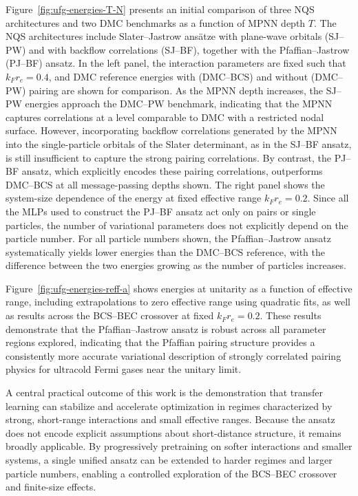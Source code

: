 Figure~\ref{fig:ufg-energies-T-N} presents an initial comparison of three NQS architectures and two DMC benchmarks as a function of MPNN depth \(T\). The NQS architectures include Slater--Jastrow ans\"atze with plane-wave orbitals (SJ--PW) and with backflow correlations (SJ--BF), together with the Pfaffian--Jastrow (PJ--BF) ansatz. In the left panel, the interaction parameters are fixed such that \(k_F r_e = 0.4\), and DMC reference energies with (DMC--BCS) and without (DMC--PW) pairing are shown for comparison.
As the MPNN depth increases, the SJ--PW energies approach the DMC--PW benchmark, indicating that the MPNN captures correlations at a level comparable to DMC with a restricted nodal surface. 
However, incorporating backflow correlations generated by the MPNN into the single-particle orbitals of the Slater determinant, as in the SJ--BF ansatz, is still insufficient to capture the strong pairing correlations.
By contrast, the PJ--BF ansatz, which explicitly encodes these pairing correlations, outperforms DMC--BCS at all message-passing depths shown.
The right panel shows the system-size dependence of the energy at fixed effective range \(k_F r_e = 0.2\). Since all the MLPs used to construct the PJ--BF ansatz act only on pairs or single particles, the number of variational parameters does not explicitly depend on the particle number. For all particle numbers shown, the Pfaffian--Jastrow ansatz systematically yields lower energies than the DMC--BCS reference, with the difference between the two energies growing as the number of particles increases.



Figure~\ref{fig:ufg-energies-reff-a} shows energies at unitarity as a function of effective range, including extrapolations to zero effective range using quadratic fits, as well as results across the BCS--BEC crossover at fixed \(k_F r_e = 0.2\). These results demonstrate that the Pfaffian--Jastrow ansatz is robust across all parameter regions explored, indicating that the Pfaffian pairing structure provides a consistently more accurate variational description of strongly correlated pairing physics for ultracold Fermi gases near the unitary limit.


A central practical outcome of this work is the demonstration that transfer learning can stabilize and accelerate optimization in regimes characterized by strong, short-range interactions and small effective ranges. Because the ansatz does not encode explicit assumptions about short-distance structure, it remains broadly applicable. By progressively pretraining on softer interactions and smaller systems, a single unified ansatz can be extended to harder regimes and larger particle numbers, enabling a controlled exploration of the BCS--BEC crossover and finite-size effects.

